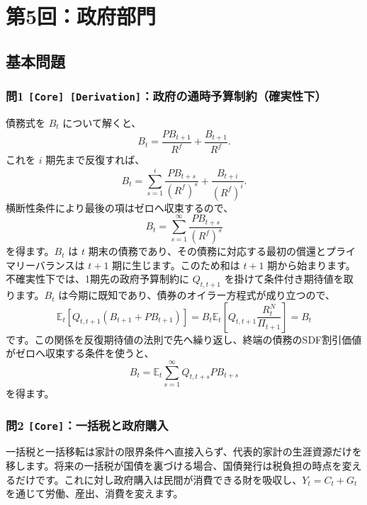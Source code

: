 \documentclass[
  japanese,
  lualatex,
  ja=standard,
  11pt,
  a4paper]{ltjsarticle}
\begin{document}
\clearpage

\section{第5回：政府部門}\label{ux7b2c5ux56deux653fux5e9cux90e8ux9580}

\subsection{基本問題}\label{ux57faux672cux554fux984c-4}

\subsubsection{\texorpdfstring{問1
\texttt{{[}Core{]}\ {[}Derivation{]}}：政府の通時予算制約（確実性下）}{問1 {[}Core{]} {[}Derivation{]}：政府の通時予算制約（確実性下）}}\label{ux554f1-core-derivationux653fux5e9cux306eux901aux6642ux4e88ux7b97ux5236ux7d04ux78baux5b9fux6027ux4e0b}

債務式を \(B_t\) について解くと、 \[
B_t=\frac{PB_{t+1}}{R^f}+\frac{B_{t+1}}{R^f}.
\] これを \(i\) 期先まで反復すれば、 \[
B_t
=\sum_{s=1}^{i}\frac{PB_{t+s}}{(R^f)^s}
+\frac{B_{t+i}}{(R^f)^i}.
\] 横断性条件により最後の項はゼロへ収束するので、 \[
B_t=\sum_{s=1}^{\infty}\frac{PB_{t+s}}{(R^f)^s}
\] を得ます。\(B_t\) は \(t\)
期末の債務であり、その債務に対応する最初の償還とプライマリーバランスは
\(t+1\) 期に生じます。このため和は \(t+1\)
期から始まります。不確実性下では、1期先の政府予算制約に \(Q_{t,t+1}\)
を掛けて条件付き期待値を取ります。\(B_t\)
は今期に既知であり、債券のオイラー方程式が成り立つので、 \[
\mathbb E_t\left[Q_{t,t+1}(B_{t+1}+PB_{t+1})\right]
=B_t\mathbb E_t\left[Q_{t,t+1}\frac{R_t^N}{\Pi_{t+1}}\right]
=B_t
\]
です。この関係を反復期待値の法則で先へ繰り返し、終端の債務のSDF割引価値がゼロへ収束する条件を使うと、
\[
B_t=\mathbb E_t\sum_{s=1}^{\infty}Q_{t,t+s}PB_{t+s}
\] を得ます。

\subsubsection{\texorpdfstring{問2
\texttt{{[}Core{]}}：一括税と政府購入}{問2 {[}Core{]}：一括税と政府購入}}\label{ux554f2-coreux4e00ux62ecux7a0eux3068ux653fux5e9cux8cfcux5165}

一括税と一括移転は家計の限界条件へ直接入らず、代表的家計の生涯資源だけを移します。将来の一括税が国債を裏づける場合、国債発行は税負担の時点を変えるだけです。これに対し政府購入は民間が消費できる財を吸収し、\(Y_t=C_t+G_t\)
を通じて労働、産出、消費を変えます。
\end{document}
